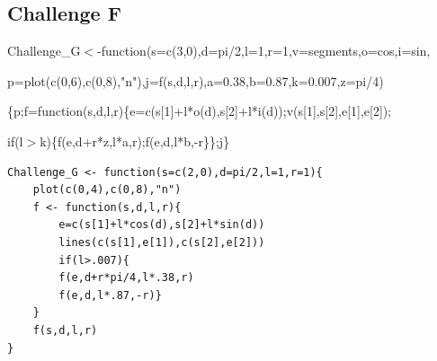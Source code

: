 \documentclass[12pt]{article}
\begin{document}
\subsection{Challenge F}

Challenge\_G$<$-function(s=c(3,0),d=pi/2,l=1,r=1,v=segments,o=cos,i=sin,

p=plot(c(0,6),c(0,8),"n"),j=f(s,d,l,r),a=0.38,b=0.87,k=0.007,z=pi/4)

\{p;f=function(s,d,l,r)\{e=c(s[1]+l*o(d),s[2]+l*i(d));v(s[1],s[2],e[1],e[2]);

if(l$>$k)\{f(e,d+r*z,l*a,r);f(e,d,l*b,-r\}\};j\}


\centering 
\begin{lstlisting} 
Challenge_G <- function(s=c(2,0),d=pi/2,l=1,r=1){
    plot(c(0,4),c(0,8),"n")
    f <- function(s,d,l,r){
        e=c(s[1]+l*cos(d),s[2]+l*sin(d))
        lines(c(s[1],e[1]),c(s[2],e[2]))
        if(l>.007){
        f(e,d+r*pi/4,l*.38,r)
        f(e,d,l*.87,-r)}
    }
    f(s,d,l,r)
} 

\end{lstlisting}
\end{document}
